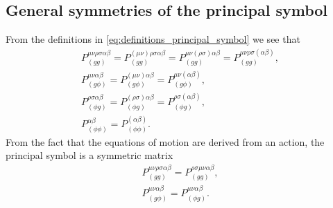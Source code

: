 \documentclass{ws-ijmpd}
\begin{document}
\subsection{General symmetries of the principal symbol}
From the definitions in \eqref{eq:definitions_principal_symbol}
we see that
\begin{subequations}
\begin{align}
   P_{(gg)}^{\mu\nu\rho\sigma\alpha\beta}
   =
   P_{(gg)}^{(\mu\nu)\rho\sigma\alpha\beta}
   =
   P_{(gg)}^{\mu\nu(\rho\sigma)\alpha\beta}
   =
   P_{(gg)}^{\mu\nu\rho\sigma(\alpha\beta)}
   ,\\
   P_{(g\phi)}^{\mu\nu\alpha\beta}
   =
   P_{(g\phi)}^{(\mu\nu)\alpha\beta}
   =
   P_{(g\phi)}^{\mu\nu(\alpha\beta)}
   ,\\
   P_{(\phi g)}^{\rho\sigma\alpha\beta}
   =
   P_{(\phi g)}^{(\rho\sigma)\alpha\beta}
   =
   P_{(\phi g)}^{\rho\sigma(\alpha\beta)}
   ,\\
   P_{(\phi\phi)}^{\alpha\beta}
   =
   P_{(\phi\phi)}^{(\alpha\beta)}
   .
\end{align}
\end{subequations}
From the fact that the equations of motion are derived from an action,
the principal symbol is a symmetric matrix\cite{Papallo:2017qvl} 
\begin{subequations}
\begin{align}
   P_{(gg)}^{\mu\nu\rho\sigma\alpha\beta}
   =
   P_{(gg)}^{\rho\sigma\mu\nu\alpha\beta}
   ,\\
   P_{(g\phi)}^{\mu\nu\alpha\beta}
   =
   P_{(\phi g)}^{\mu\nu\alpha\beta}
   .
\end{align}
\end{subequations}
\end{document}
